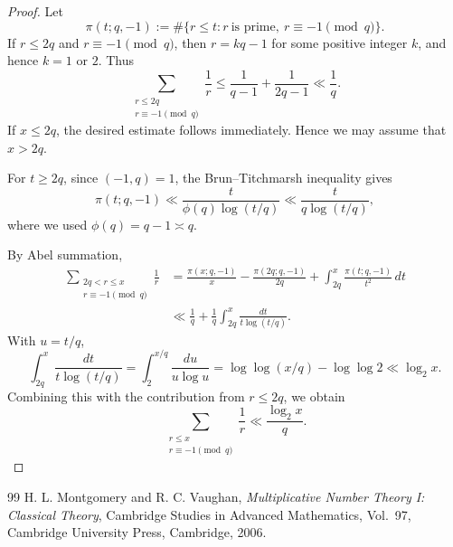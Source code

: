 \documentclass[10pt,a4paper]{amsart}
\begin{document}
\begin{proof}
Let
\[
\pi(t;q,-1)
:=
\#\{r\le t:r\ \text{is prime},\ r\equiv-1\pmod q\}.
\]
If \(r\le2q\) and \(r\equiv-1\pmod q\), then
\(r=kq-1\) for some positive integer \(k\), and hence \(k=1\) or \(2\).
Thus
\[
\sum_{\substack{r\le2q\\r\equiv-1\pmod q}}\frac1r
\le
\frac1{q-1}+\frac1{2q-1}
\ll\frac1q.
\]
If \(x\le2q\), the desired estimate follows immediately. Hence we may
assume that \(x>2q\).

For \(t\ge2q\), since \((-1,q)=1\), the Brun--Titchmarsh inequality
\cite[Theorem~3.9]{MontgomeryVaughan} gives
\[
\pi(t;q,-1)
\ll
\frac{t}{\phi(q)\log(t/q)}
\ll
\frac{t}{q\log(t/q)},
\]
where we used \(\phi(q)=q-1\asymp q\).

By Abel summation,
\[
\begin{aligned}
\sum_{\substack{2q<r\le x\\r\equiv-1\pmod q}}\frac1r
&=
\frac{\pi(x;q,-1)}x
-\frac{\pi(2q;q,-1)}{2q}
+
\int_{2q}^x\frac{\pi(t;q,-1)}{t^2}\,dt\\
&\ll
\frac1q+
\frac1q\int_{2q}^x
\frac{dt}{t\log(t/q)}.
\end{aligned}
\]
With \(u=t/q\),
\[
\int_{2q}^x\frac{dt}{t\log(t/q)}
=
\int_2^{x/q}\frac{du}{u\log u}
=
\log\log(x/q)-\log\log2
\ll\log_2x.
\]
Combining this with the contribution from \(r\le2q\), we obtain
\[
\sum_{\substack{r\le x\\r\equiv-1\pmod q}}\frac1r
\ll
\frac{\log_2x}{q}.
\]
\end{proof}

\begin{thebibliography}{99}
 H. L. Montgomery and R. C. Vaughan, \emph{Multiplicative Number Theory I: Classical Theory}, Cambridge Studies in Advanced Mathematics, Vol.~97, Cambridge University Press, Cambridge, 2006.
\end{thebibliography}
\end{document}
